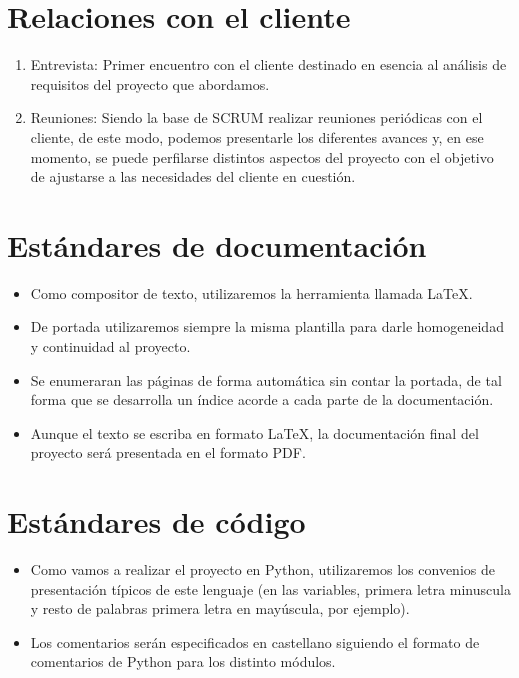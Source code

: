 \section{Relaciones con el cliente}

\begin{enumerate}
	\item Entrevista: Primer encuentro con el cliente destinado en esencia al análisis de requisitos del proyecto que abordamos. 
	\item Reuniones: Siendo la base de SCRUM realizar reuniones periódicas con el cliente, de este modo, podemos presentarle los diferentes avances y, en ese momento, se puede perfilarse distintos aspectos del proyecto con el objetivo de ajustarse a las necesidades del cliente en cuestión.
\end{enumerate}

\section{Estándares de documentación}

\begin{itemize}
	\item Como compositor de texto, utilizaremos la herramienta llamada \LaTeX.
	\item De portada utilizaremos siempre la misma plantilla para darle homogeneidad y continuidad al proyecto.
	\item Se enumeraran las páginas de forma automática sin contar la portada, de tal forma que se desarrolla un índice acorde a cada parte de la documentación.
	\item Aunque el texto se escriba en formato \LaTeX, la documentación final del proyecto será presentada en el formato PDF.
\end{itemize}

\section{Estándares de código}

\begin{itemize}
	\item Como vamos a realizar el proyecto en Python, utilizaremos los convenios de presentación típicos de este lenguaje (en las variables, primera letra minuscula y resto de palabras primera letra en mayúscula, por ejemplo).
	\item Los comentarios serán especificados en castellano siguiendo el formato de comentarios de Python para los distinto módulos.
\end{itemize}



